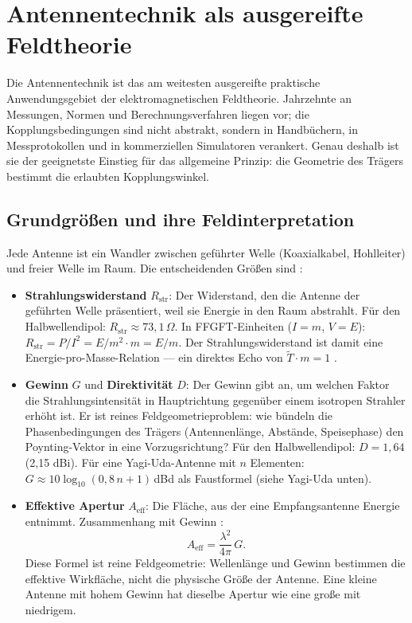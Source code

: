 \section{Antennentechnik als ausgereifte Feldtheorie}

Die Antennentechnik ist das am weitesten ausgereifte praktische Anwendungsgebiet
der elektromagnetischen Feldtheorie. Jahrzehnte an Messungen, Normen und
Berechnungsverfahren liegen vor; die Kopplungsbedingungen sind nicht abstrakt,
sondern in Handbüchern, in Messprotokollen und in kommerziellen Simulatoren
verankert. Genau deshalb ist sie der geeignetste Einstieg für das allgemeine
Prinzip: die Geometrie des Trägers bestimmt die erlaubten Kopplungswinkel.

\subsection*{Grundgrößen und ihre Feldinterpretation}

Jede Antenne ist ein Wandler zwischen geführter Welle (Koaxialkabel, Hohlleiter)
und freier Welle im Raum. Die entscheidenden Größen sind \EM:

\begin{itemize}[nosep]
\item \textbf{Strahlungswiderstand} $R_\mathrm{str}$: Der Widerstand, den die
  Antenne der geführten Welle präsentiert, weil sie Energie in den Raum abstrahlt.
  Für den Halbwellendipol: $R_\mathrm{str} \approx 73{,}1\,\Omega$.
  In FFGFT-Einheiten ($I=m$, $V=E$): $R_\mathrm{str} = P/I^2 = E/m^2 \cdot m = E/m$.
  Der Strahlungswiderstand ist damit eine Energie-pro-Masse-Relation --- ein
  direktes Echo von $\tilde{T}\cdot m=1$ \SM.

\item \textbf{Gewinn} $G$ und \textbf{Direktivität} $D$: Der Gewinn gibt an, um
  welchen Faktor die Strahlungsintensität in Hauptrichtung gegenüber einem
  isotropen Strahler erhöht ist. Er ist reines Feldgeometrieproblem: wie bündeln
  die Phasenbedingungen des Trägers (Antennenlänge, Abstände, Speisephase) den
  Poynting-Vektor in eine Vorzugsrichtung? Für den Halbwellendipol:
  $D = 1{,}64$ (2,15 dBi). Für eine Yagi-Uda-Antenne mit $n$ Elementen:
  $G \approx 10\log_{10}(0{,}8\,n+1)$\,dBd als Faustformel (siehe Yagi-Uda unten).

\item \textbf{Effektive Apertur} $A_\mathrm{eff}$: Die Fläche, aus der eine
  Empfangsantenne Energie entnimmt. Zusammenhang mit Gewinn \EM:
  \[
    A_\mathrm{eff} = \frac{\lambda^2}{4\pi}\,G.
  \]
  Diese Formel ist reine Feldgeometrie: Wellenlänge und Gewinn bestimmen die
  effektive Wirkfläche, nicht die physische Größe der Antenne. Eine kleine
  Antenne mit hohem Gewinn hat dieselbe Apertur wie eine große mit niedrigem.
\end{itemize}

